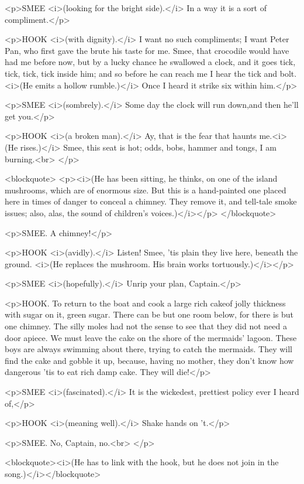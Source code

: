 <p>SMEE <i>(looking for the bright side).</i> In a way it is a sort
of compliment.</p>

<p>HOOK <i>(with dignity).</i> I want no such compliments; I want
Peter Pan, who first gave the brute his taste for me. Smee, that
crocodile would have had me before now, but by a lucky chance he
swallowed a clock, and it goes tick, tick, tick, tick inside him; and
so before he can reach me I hear the tick and bolt. <i>(He emits a
hollow rumble.)</i> Once I heard it strike six within him.</p>

<p>SMEE <i>(sombrely).</i> Some day the clock will run down,and then
he'll get you.</p>

<p>HOOK <i>(a broken man).</i> Ay, that is the fear that haunts
me.<i>(He rises.)</i> Smee, this seat is hot; odds, bobs, hammer and
tongs, I am burning.<br>
</p>

<blockquote>
<p><i>(He has been sitting, he thinks, on one of the island
mushrooms, which are of enormous size. But this is a hand-painted one
placed here in times of danger to conceal a chimney. They remove it,
and tell-tale smoke issues; also, alas, the sound of children's
voices.)</i></p>
</blockquote>

<p>SMEE. A chimney!</p>

<p>HOOK <i>(avidly).</i> Listen! Smee, 'tis plain they live here,
beneath the ground. <i>(He replaces the mushroom. His brain works
tortuously.)</i></p>

<p>SMEE <i>(hopefully).</i> Unrip your plan, Captain.</p>

<p>HOOK. To return to the boat and cook a large rich cakeof jolly
thickness with sugar on it, green sugar. There can be but one room
below, for there is but one chimney. The silly moles had not the
sense to see that they did not need a door apiece. We must leave the
cake on the shore of the mermaids' lagoon. These boys are always
swimming about there, trying to catch the mermaids. They will find
the cake and gobble it up, because, having no mother, they don't know
how dangerous 'tis to eat rich damp cake. They will die!</p>

<p>SMEE <i>(fascinated).</i> It is the wickedest, prettiest policy
ever I heard of,</p>

<p>HOOK <i>(meaning well).</i> Shake hands on 't.</p>

<p>SMEE. No, Captain, no.<br>
</p>

<blockquote><i>(He has to link with the hook, but he does not join in
the song.)</i></blockquote>

